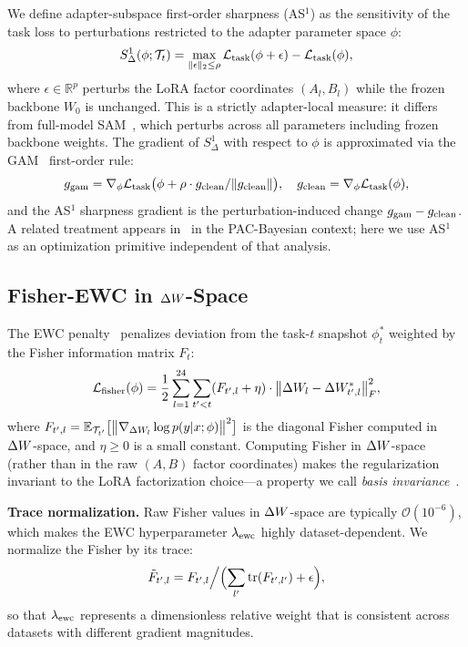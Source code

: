 We define adapter-subspace first-order sharpness (AS$^1$) as the sensitivity of the task loss
to perturbations restricted to the adapter parameter space $\phi$:
\begin{equation}
  S^1_\Delta(\phi; \mathcal{T}_t) = \max_{\|\epsilon\|_2 \leq \rho} \mathcal{L}_{\mathrm{task}}(\phi + \epsilon) - \mathcal{L}_{\mathrm{task}}(\phi),
\end{equation}
where $\epsilon \in \mathbb{R}^p$ perturbs the LoRA factor coordinates $(A_l, B_l)$
while the frozen backbone $W_0$ is unchanged.
This is a strictly adapter-local measure: it differs from full-model SAM~\citep{foretSharpnessAwareMinimizationEfficiently2021},
which perturbs across all parameters including frozen backbone weights.
The gradient of $S^1_\Delta$ with respect to $\phi$ is approximated via the
GAM~\citep{zhengGradientAwareminimizationDistributed2021} first-order rule:
\begin{equation}
  g_{\mathrm{gam}} = \nabla_\phi \mathcal{L}_{\mathrm{task}}\bigl(\phi + \rho \cdot g_{\mathrm{clean}}/\|g_{\mathrm{clean}}\|\bigr),
  \quad g_{\mathrm{clean}} = \nabla_\phi \mathcal{L}_{\mathrm{task}}(\phi),
\end{equation}
and the AS$^1$ sharpness gradient is the perturbation-induced change $g_{\mathrm{gam}} - g_{\mathrm{clean}}$.
A related treatment appears in~\citet{Anonymous2026PaperB} in the PAC-Bayesian context;
here we use AS$^1$ as an optimization primitive independent of that analysis.

\subsection{Fisher-EWC in $\Delta W$-Space}

The EWC penalty~\citep{EWC2017} penalizes deviation from the task-$t$ snapshot $\phi^*_t$
weighted by the Fisher information matrix $F_t$:
\begin{equation}
  \mathcal{L}_{\mathrm{fisher}}(\phi) = \frac{1}{2} \sum_{l=1}^{24} \sum_{t'<t}
  (F_{t',l} + \eta) \cdot \bigl\| \Delta W_l - \Delta W^*_{t',l} \bigr\|_F^2,
\end{equation}
where $F_{t',l} = \mathbb{E}_{\mathcal{T}_{t'}}\bigl[\bigl\|\nabla_{\Delta W_l} \log p(y|x;\phi)\bigr\|^2\bigr]$
is the diagonal Fisher computed in $\Delta W$-space, and $\eta \geq 0$ is a small constant.
Computing Fisher in $\Delta W$-space (rather than in the raw $(A, B)$ factor coordinates)
makes the regularization invariant to the LoRA factorization choice---a property
we call \emph{basis invariance}~\citep{zheng2025ewclora}.

\textbf{Trace normalization.}
Raw Fisher values in $\Delta W$-space are typically $\mathcal{O}(10^{-6})$,
which makes the EWC hyperparameter $\lambda_{\mathrm{ewc}}$ highly dataset-dependent.
We normalize the Fisher by its trace:
\begin{equation}
  \tilde{F}_{t',l} = F_{t',l} \Big/ \Bigl(\sum_{l'} \mathrm{tr}(F_{t',l'}) + \epsilon\Bigr),
  \label{eq:trace_norm}
\end{equation}
so that $\lambda_{\mathrm{ewc}}$ represents a dimensionless relative weight that is consistent
across datasets with different gradient magnitudes.
